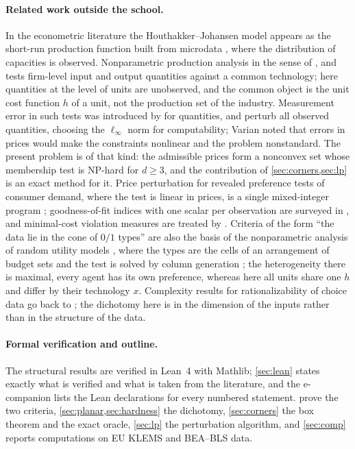 \paragraph{Related work outside the school.}
In the econometric literature the Houthakker--Johansen model appears as the short-run production function built from microdata \citep{Hildenbrand1981}, where the distribution of capacities is observed. Nonparametric production analysis in the sense of \citet{Afriat1972}, \citet{HanochRothschild1972} and \citet{Varian1984} tests firm-level input and output quantities against a common technology; here quantities at the level of units are unobserved, and the common object is the unit cost function $h$ of a unit, not the production set of the industry. Measurement error in such tests was introduced by \citet{Varian1985} for quantities, and \citet{KuosmanenPostScholtes2007} perturb all observed quantities, choosing the $\ell_\infty$ norm for computability; Varian noted that errors in prices would make the constraints nonlinear and the problem nonstandard. The present problem is of that kind: the admissible prices form a nonconvex set whose membership test is NP-hard for $d\ge3$, and the contribution of \cref{sec:corners,sec:lp} is an exact method for it. Price perturbation for revealed preference tests of consumer demand, where the test is linear in prices, is a single mixed-integer program \citep{DemuynckRehbeck2023}; goodness-of-fit indices with one scalar per observation are surveyed in \citet{Cherchye2014}, and minimal-cost violation measures are treated by \citet{DeanMartin2016}. Criteria of the form ``the data lie in the cone of $0/1$ types'' are also the basis of the nonparametric analysis of random utility models \citep{McFaddenRichter1990,KitamuraStoye2018}, where the types are the cells of an arrangement of budget sets and the test is solved by column generation \citep{SmeuldersCherchyeDeRock2021}; the heterogeneity there is maximal, every agent has its own preference, whereas here all units share one $h$ and differ by their technology $x$. Complexity results for rationalizability of choice data go back to \citet{ApesteguiaBallester2010}; the dichotomy here is in the dimension of the inputs rather than in the structure of the data.

\paragraph{Formal verification and outline.}
The structural results are verified in Lean~4 with Mathlib; \cref{sec:lean} states exactly what is verified and what is taken from the literature, and the e-companion lists the Lean declarations for every numbered statement.  prove the two criteria, \cref{sec:planar,sec:hardness} the dichotomy, \cref{sec:corners} the box theorem and the exact oracle, \cref{sec:lp} the perturbation algorithm, and \cref{sec:comp} reports computations on EU KLEMS and BEA--BLS data.
